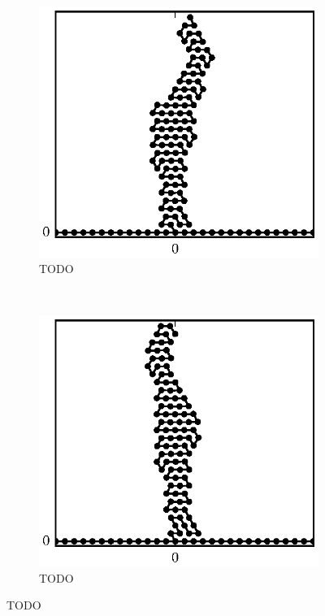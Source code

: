 \begin{figure}
		\begin{subfigure}{.5\textwidth}
			\centering
			\includegraphics{./fig/ch3/fs/b0.2_eb3.eps}
			\caption{TODO \label{subfig:fs_crystal3}}
		\end{subfigure}%
		~
		\begin{subfigure}{.5\textwidth}
			\centering
			\includegraphics{./fig/ch3/fs/b0.2_eb9.eps}
			\caption{TODO \label{subfig:fs_crystal4}}
		\end{subfigure}	
		\caption{TODO\label{fig:fs_crystal}}	
	\end{figure}


